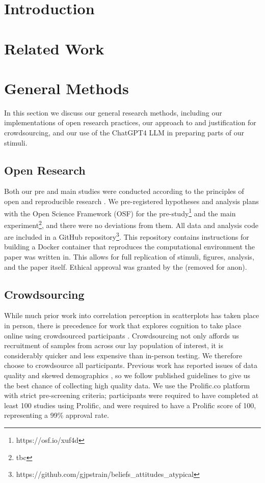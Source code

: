 \documentclass[manuscript,screen,review]{acmart}
\begin{document}
\setlength{\parskip}{-0.1pt}

\section{Introduction}\label{sec-intro-main}

\section{Related Work}\label{sec-rel-work-main}

\section{General Methods}\label{sec-general-methods}

In this section we discuss our general research methods, including our
implementations of open research practices, our approach to and
justification for crowdsourcing, and our use of the ChatGPT4 LLM in
preparing parts of our stimuli.

\subsection{Open Research}\label{sec-open-research}

Both our pre and main studies were conducted according to the principles
of open and reproducible research \citep{ayris_2018}. We pre-registered
hypotheses and analysis plans with the Open Science Framework (OSF) for
the pre-study\footnote{https://osf.io/xuf4d} and the main
experiment\footnote{tbc}, and there were no deviations from them. All
data and analysis code are included in a GitHub repository\footnote{https://github.com/gjpstrain/beliefs\_attitudes\_atypical}.
This repository contains instructions for building a Docker container
\citep{merkel_2014} that reproduces the computational environment the
paper was written in. This allows for full replication of stimuli,
figures, analysis, and the paper itself. Ethical approval was granted by
the (removed for anon).

\subsection{Crowdsourcing}\label{crowdsourcing}

While much prior work into correlation perception in scatterplots has
taken place in person, there is precedence for work that explores
cognition to take place online using crowdsourced participants
\citep{xiong_2022}. Crowdsourcing not only affords us recruitment of
samples from across our lay population of interest, it is considerably
quicker and less expensive than in-person testing. We therefore choose
to crowdsource all participants. Previous work has reported issues of
data quality and skewed demographics
\citep{chmielewski_2020, charalambides_2021, peer_2021}, so we follow
published guidelines \citep{peer_2021} to give us the best chance of
collecting high quality data. We use the Prolific.co platform
\citep{prolific} with strict pre-screening criteria; participants were
required to have completed at least 100 studies using Prolific, and were
required to have a Prolific score of 100, representing a 99\% approval
rate.
\end{document}
